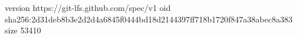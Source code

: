version https://git-lfs.github.com/spec/v1
oid sha256:2d31deb8b3e2d2d4a6845f0444bd18d2144397ff718b1720f847a38abec8a383
size 53410
